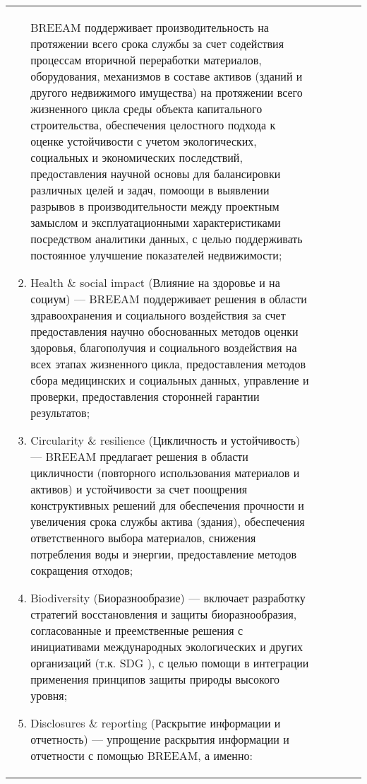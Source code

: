 \begin{landscape}
\begin{center}
\begin{longtable}{|m{40mm}|p{40mm}|p{40mm}|p{55mm}|p{55mm}|}
\begin{enumerate}[1)]
                                BREEAM поддерживает производительность на протяжении всего срока службы за счет содействия процессам вторичной переработки материалов,
                                оборудования, механизмов в составе активов (зданий и другого недвижимого имущества) на протяжении всего жизненного цикла среды объекта капитального строительства,
                                обеспечения целостного подхода к оценке устойчивости с учетом экологических, социальных и экономических последствий,
                                предоставления научной основы для балансировки различных целей и задач,
                                помоощи в выявлении разрывов в производительности между проектным замыслом и эксплуатационными характеристиками посредством аналитики данных,
                                с целью поддерживать постоянное улучшение показателей недвижимости;
                            \item Health \& social impact (Влияние на здоровье и на социум) --- BREEAM поддерживает решения в области здравоохранения и социального воздействия за счет
                                предоставления научно обоснованных методов оценки здоровья, благополучия и социального воздействия на всех этапах жизненного цикла,
                                предоставления методов сбора медицинских и социальных данных, управление и проверки, предоставления сторонней гарантии результатов;
                            \item Circularity \& resilience (Цикличность и устойчивость) --- BREEAM предлагает решения в области цикличности (повторного использования материалов и активов) и устойчивости за счет
                                поощрения конструктивных решений для обеспечения прочности и увеличения срока службы актива (здания), обеспечения ответственного выбора материалов,
                                снижения потребления воды и энергии, предоставление методов сокращения отходов;
                            \item Biodiversity (Биоразнообразие) --- включает разработку стратегий восстановления и защиты биоразнообразия,
                                согласованные и преемственные решения с инициативами международных экологических и других организаций (т.к. SDG \cite{UN_17Goals}),
                                с целью помощи в интеграции применения принципов защиты природы высокого уровня;
                            \item Disclosures \& reporting (Раскрытие информации и отчетность) --- упрощение раскрытия информации и отчетности с помощью BREEAM, а именно:

\end{enumerate}
\end{longtable}
\end{center}
\end{landscape}
